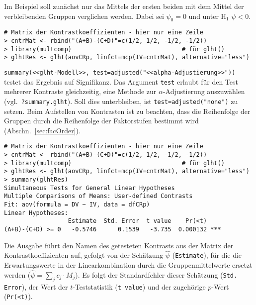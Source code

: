 Im Beispiel soll zunächst nur das Mittels der ersten beiden mit dem Mittel der verbleibenden Gruppen verglichen werden. Dabei sei $\psi_{0} = 0$ und unter $\text{H}_{1}$ $\psi < 0$.
\begin{lstlisting}
# Matrix der Kontrastkoeffizienten - hier nur eine Zeile
> cntrMat <- rbind("(A+B)-(C+D)"=c(1/2, 1/2, -1/2, -1/2))
> library(multcomp)                               # für glht()
> glhtRes <- glht(aovCRp, linfct=mcp(IV=cntrMat), alternative="less")
\end{lstlisting}

\lstinline!summary(<<glht-Modell>>, test=adjusted("<<alpha-Adjustierung>>"))! testet das Ergebnis auf Signifikanz. Das Argument \lstinline!test! erlaubt für den Test mehrerer Kontraste gleichzeitig, eine Methode zur $\alpha$-Adjustierung auszuwählen (vgl.\ \lstinline!?summary.glht!). Soll dies unterbleiben, ist \lstinline!test=adjusted("none")! zu setzen. Beim Aufstellen von Kontrasten ist zu beachten, dass die Reihenfolge der Gruppen durch die Reihenfolge der Faktorstufen bestimmt wird (Abschn.\ \ref{sec:facOrder}).
\begin{lstlisting}
# Matrix der Kontrastkoeffizienten - hier nur eine Zeile
> cntrMat <- rbind("(A+B)-(C+D)"=c(1/2, 1/2, -1/2, -1/2))
> library(multcomp)                               # für glht()
> glhtRes <- glht(aovCRp, linfct=mcp(IV=cntrMat), alternative="less")
> summary(glhtRes)
Simultaneous Tests for General Linear Hypotheses
Multiple Comparisons of Means: User-defined Contrasts
Fit: aov(formula = DV ~ IV, data = dfCRp)
Linear Hypotheses:
                  Estimate  Std. Error  t value    Pr(<t)
(A+B)-(C+D) >= 0   -0.5746      0.1539   -3.735  0.000132 ***
\end{lstlisting}

Die Ausgabe führt den Namen des getesteten Kontrasts aus der Matrix der Kontrastkoeffizienten auf, gefolgt von der Schätzung $\hat{\psi}$ (\lstinline!Estimate!), für die die Erwartungswerte in der Linearkombination durch die Gruppenmittelwerte ersetzt werden ($\hat{\psi} = \sum_{j} c_{j} \cdot M_{j}$). Es folgt der Standardfehler dieser Schätzung (\lstinline!Std. Error!), der Wert der $t$-Teststatistik (\lstinline!t value!) und der zugehörige $p$-Wert (\lstinline!Pr(<t)!).

